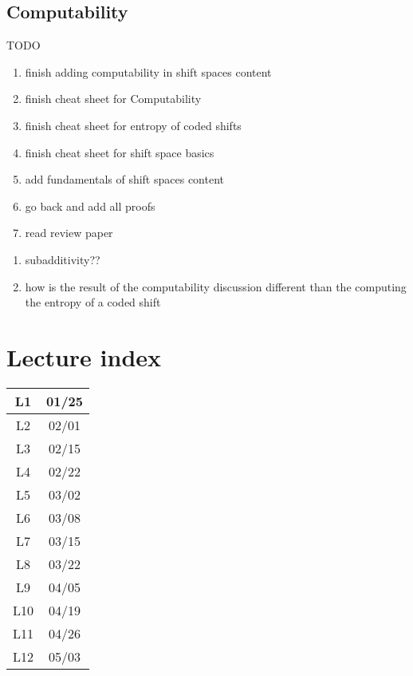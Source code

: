 \documentclass[11pt, reqno]{amsart}
\theoremstyle{plain}
\numberwithin{thm}{subsection}
\theoremstyle{definition}
\begin{document}
{\begin{multicols}{2}
\subsection{Computability}

\end{multicols}
}

TODO
\begin{enumerate}
  \item finish adding computability in shift spaces content
  \item finish cheat sheet for Computability
  \item finish cheat sheet for entropy of coded shifts 
  \item finish cheat sheet for shift space basics
  \item add fundamentals of shift spaces content 
  \item go back and add all proofs
  \item read review paper
\end{enumerate}

\begin{enumerate}
  \item subadditivity??
  \item how is the result of the computability discussion different than the computing the entropy of a coded shift
\end{enumerate}

\newpage
\section{Lecture index}  

\begin{tabular}{|c|c|}\hline
  L1 & 01/25 \\ \hline
  L2 & 02/01 \\ \hline
  L3 & 02/15 \\ \hline
  L4 & 02/22 \\ \hline
  L5 & 03/02 \\ \hline
  L6 & 03/08 \\ \hline
  L7 & 03/15 \\ \hline
  L8 & 03/22 \\ \hline
  L9 & 04/05 \\ \hline
  L10 & 04/19 \\ \hline
  L11 & 04/26 \\ \hline
  L12 & 05/03 \\ \hline
\end{tabular}

\printbibliography
\end{document}
